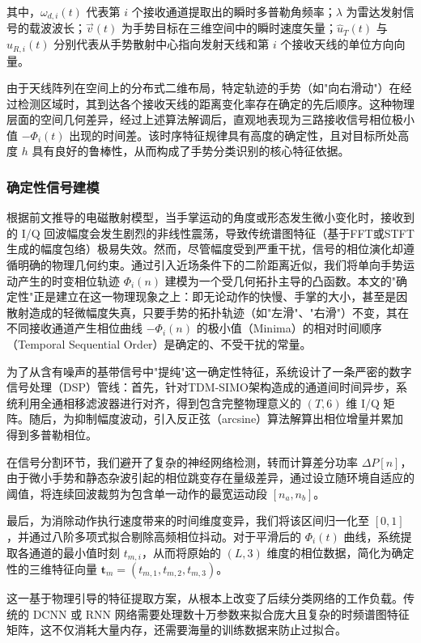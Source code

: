 其中，$\omega_{d,i}(t)$ 代表第 $i$ 个接收通道提取出的瞬时多普勒角频率；$\lambda$ 为雷达发射信号的载波波长；$\vec{v}(t)$ 为手势目标在三维空间中的瞬时速度矢量；$\hat{u}_{T}(t)$ 与 $\hat{u}_{R,i}(t)$ 分别代表从手势散射中心指向发射天线和第 $i$ 个接收天线的单位方向向量。

由于天线阵列在空间上的分布式二维布局，特定轨迹的手势（如"向右滑动"）在经过检测区域时，其到达各个接收天线的距离变化率存在确定的先后顺序。这种物理层面的空间几何差异，经过上述算法解调后，直观地表现为三路接收信号相位极小值 $-\Phi_{i}(t)$ 出现的时间差。该时序特征规律具有高度的确定性，且对目标所处高度 $h$ 具有良好的鲁棒性，从而构成了手势分类识别的核心特征依据。

\subsubsection{确定性信号建模}

根据前文推导的电磁散射模型，当手掌运动的角度或形态发生微小变化时，接收到的 I/Q 回波幅度会发生剧烈的非线性震荡，导致传统谱图特征（基于FFT或STFT生成的幅度包络）极易失效。然而，尽管幅度受到严重干扰，信号的相位演化却遵循明确的物理几何约束。通过引入近场条件下的二阶距离近似，我们将单向手势运动产生的时变相位轨迹 $\Phi_{i}(n)$ 建模为一个受几何拓扑主导的凸函数。本文的"确定性"正是建立在这一物理现象之上：即无论动作的快慢、手掌的大小，甚至是因散射造成的轻微幅度失真，只要手势的拓扑轨迹（如"左滑"、"右滑"）不变，其在不同接收通道产生相位曲线 $-\Phi_{i}(n)$ 的极小值（Minima）的相对时间顺序（Temporal Sequential Order）是确定的、不受干扰的常量\cite{lien2016soli}。

为了从含有噪声的基带信号中"提纯"这一确定性特征，系统设计了一条严密的数字信号处理（DSP）管线：首先，针对TDM-SIMO架构造成的通道间时间异步，系统利用全通相移滤波器进行对齐，得到包含完整物理意义的 $(T, 6)$ 维 I/Q 矩阵。随后，为抑制幅度波动，引入反正弦（arcsine）算法解算出相位增量并累加得到多普勒相位。

在信号分割环节，我们避开了复杂的神经网络检测，转而计算差分功率 $\Delta P[n]$，由于微小手势和静态杂波引起的相位跳变存在量级差异，通过设立随环境自适应的阈值，将连续回波裁剪为包含单一动作的最宽运动段 $[n_{a}, n_{b}]$。

最后，为消除动作执行速度带来的时间维度变异，我们将该区间归一化至 $[0, 1]$，并通过八阶多项式拟合剔除高频相位抖动。对于平滑后的 $\Phi_{i}(t)$ 曲线，系统提取各通道的最小值时刻 $t_{m,i}$，从而将原始的 $(L, 3)$ 维度的相位数据，简化为确定性的三维特征向量 $\boldsymbol{t}_{m} = (t_{m,1}, t_{m,2}, t_{m,3})$。

这一基于物理引导的特征提取方案，从根本上改变了后续分类网络的工作负载。传统的 DCNN 或 RNN 网络需要处理数十万参数来拟合庞大且复杂的时频谱图特征矩阵，这不仅消耗大量内存，还需要海量的训练数据来防止过拟合。

